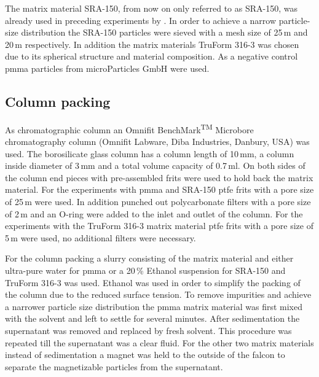 The matrix material SRA-150, from now on only referred to as SRA-150, was already used in preceding experiments by \cite{AndreMaster}. In order to achieve a narrow particle-size distribution the SRA-150 particles were sieved with a mesh size of 25\,\textmu m and 20\,\textmu m respectively. In addition the matrix materials TruForm 316-3 was chosen due to its spherical structure and material composition. 
As a negative control \gls{pmma} particles from microParticles GmbH were used.  

\subsection{Column packing}
\label{subsec:col_pack}
As chromatographic column an Omnifit\textsuperscript{\textregistered} BenchMark\textsuperscript{TM} Microbore chromatography column (Omnifit Labware, Diba Industries, Danbury, USA) was used. The borosilicate glass column has a column length of 10\,mm, a column inside diameter of 3\,mm and a total volume capacity of 0.7\,ml. On both sides of the column end pieces with pre-assembled frits were used to hold back the matrix material. For the experiments with \gls{pmma} and SRA-150 \gls{ptfe} frits with a pore size of 25\,\textmu m were used. In addition punched out polycarbonate filters with a pore size of 2\,\textmu m and an O-ring were added to the inlet and outlet of the column. For the experiments with the TruForm 316-3 matrix material \gls{ptfe} frits with a pore size of 5\,\textmu m were used, no additional filters were necessary. 

For the column packing a slurry consisting of the matrix material and either ultra-pure water for \gls{pmma} or a 20\,\% Ethanol suspension for SRA-150 and TruForm 316-3 was used. Ethanol was used in order to simplify the packing of the column due to the reduced surface tension. To remove impurities and achieve a narrower particle size distribution the \gls{pmma} matrix material was first mixed with the solvent and left to settle for several minutes. After sedimentation the supernatant was removed and replaced by fresh solvent. This procedure was repeated till the supernatant was a clear fluid. For the other two matrix materials instead of sedimentation a magnet was held to the outside of the falcon to separate the magnetizable particles from the supernatant.

